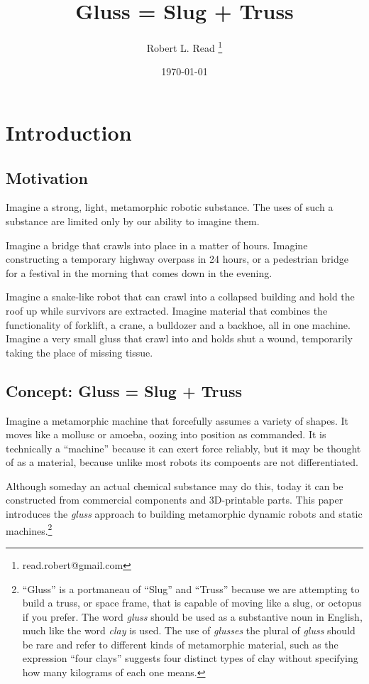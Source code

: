 \documentclass[12pt]{article}
\title{Gluss = Slug + Truss}
\author{Robert L. Read
  \thanks{read.robert@gmail.com}
}
\affil{Founder, Public Invention, an educational non-profit.}
\date{\today}
\begin{document}
\maketitle


\tableofcontents

\section{Introduction}

\subsection{Motivation}

Imagine a strong, light, metamorphic robotic substance.
The uses of such a substance are limited only by our ability to imagine them.

Imagine a bridge that crawls into place in a matter of hours.
Imagine constructing a temporary highway overpass in 24 hours, or a pedestrian bridge for a festival
in the morning that comes down in the evening.

Imagine a snake-like robot that can crawl into a collapsed building and hold the roof up
while survivors are extracted.
Imagine material that combines the functionality of forklift, a crane, a bulldozer and a backhoe,
all in one machine. Imagine a very small gluss that crawl into and holds shut a wound,
temporarily taking the place of missing tissue.

\subsection{Concept: Gluss = Slug + Truss}

Imagine a metamorphic machine that forcefully assumes a variety of shapes. It moves like a mollusc or amoeba,
oozing into position as commanded. It is technically a ``machine'' because it can exert force reliably, but
it may be thought of as a material, because unlike most robots its compoents are not differentiated.

Although someday an actual chemical substance may do this, today it can be constructed from commercial components
and 3D-printable parts. This paper introduces the \emph{gluss} approach to building metamorphic dynamic robots
and static machines.\footnote{ ``Gluss'' is a portmaneau of ``Slug'' and ``Truss'' because we are attempting to
build a truss, or space frame, that is capable of moving like a slug, or octopus if you prefer.
The word \textit{gluss}
should be used as a substantive noun in English, much like the word \textit{clay} is used.
The use of \textit{glusses} the plural
of \textit{gluss} should be rare and refer to different kinds of metamorphic material, such as the expression
``four clays'' suggests four distinct types of clay without specifying how many kilograms of each one means.}
\end{document}
